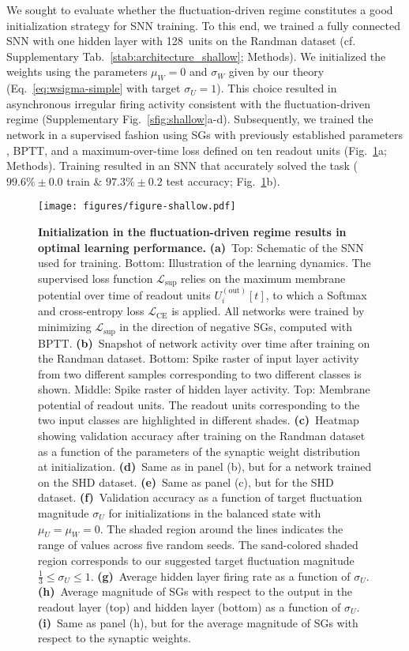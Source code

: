 \documentclass[11pt,a4paper]{article}
\begin{document}
We sought to evaluate whether the fluctuation-driven regime constitutes a good
initialization strategy for \ac{SNN} training.
To this end, we trained a fully connected \ac{SNN} with one hidden layer with
128~units on the Randman dataset (cf. Supplementary Tab.~\ref{stab:architecture_shallow}; Methods).
We initialized the weights using the parameters $\mu_W=0$ and $\sigma_W$ given
by our theory (Eq.~\eqref{eq:wsigma-simple} with target $\sigma_U=1$).
This choice resulted in asynchronous irregular firing activity consistent with
the fluctuation-driven regime (Supplementary Fig.~\ref{sfig:shallow}a-d). 
Subsequently, we trained the network in a supervised fashion using \acp{SG}
with previously established parameters \citep{Zenke2021-zg}, 
\ac{BPTT}, and a maximum-over-time loss defined on ten
readout units (Fig.~\ref{fig:shallow}a; Methods).
Training resulted in an \ac{SNN} that accurately solved the task ($99.6\%\pm0.0$ train \& $97.3\%\pm0.2$ test accuracy; Fig.~\ref{fig:shallow}b).

\begin{figure}[tbhp]
    \centering
    \texttt{[image: figures/figure-shallow.pdf]}
    \caption{\textbf{Initialization in the fluctuation-driven regime results in
optimal learning performance.} 
    \textbf{(a)}~Top: Schematic of the \ac{SNN} used for
training.
    Bottom: Illustration of the learning dynamics. The supervised loss
function $\mathcal{L}_{\text{sup}}$ relies on the maximum membrane potential
over time of readout units $U_i^{(\text{out})}[t]$, to which a Softmax and
cross-entropy loss $\mathcal{L}_{\text{CE}}$ is applied. All networks were
trained by minimizing $\mathcal{L}_{\text{sup}}$ in the direction of negative
\acp{SG}, computed with \ac{BPTT}.
    \textbf{(b)}~Snapshot of network activity over time after training on the
Randman dataset. Bottom: Spike raster of input layer activity from two
different samples corresponding to two different classes is shown. Middle:
Spike raster of hidden layer activity. Top: Membrane potential of readout
units. The readout units corresponding to the two input classes are highlighted
in different shades.
    \textbf{(c)}~Heatmap showing validation accuracy after training on the
Randman dataset as a function of the parameters of the synaptic weight
distribution at initialization. 
    \textbf{(d)}~Same as in panel (b), but for a network trained on the SHD
dataset.
    \textbf{(e)}~Same as panel (c), but for the SHD dataset.
    \textbf{(f)}~Validation accuracy as a function of target fluctuation
magnitude $\sigma_U$ for initializations in the balanced state with $\mu_U =
\mu_W = 0$. 
The shaded region around the lines indicates the range of values across five random seeds. The sand-colored shaded region corresponds to our suggested target fluctuation magnitude $\frac{1}{3} \leq \sigma_U \leq 1$.
    \textbf{(g)}~Average hidden layer firing rate as a function of
$\sigma_U$.
    \textbf{(h)}~Average magnitude of \acp{SG} with respect to the 
output in the readout layer (top) and hidden layer (bottom) as a function of
$\sigma_U$.
    \textbf{(i)}~Same as panel (h), but for the average magnitude of \acp{SG} with respect to the synaptic weights.
    }
    \label{fig:shallow}
\end{figure}
\end{document}
